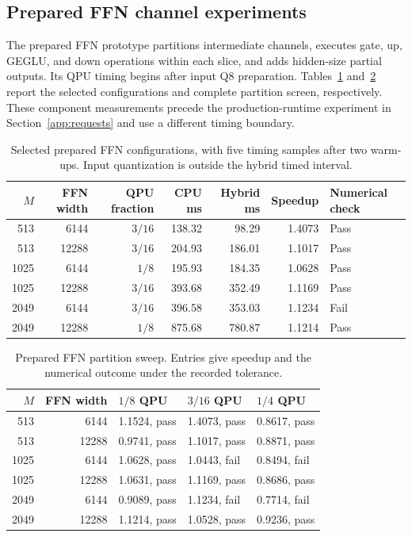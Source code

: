 \documentclass[sigplan,screen,review]{acmart}
\begin{document}
\subsection{Prepared FFN channel experiments}

The prepared FFN prototype partitions intermediate channels, executes gate, up, GEGLU, and down operations within each slice, and adds hidden-size partial outputs. Its QPU timing begins after input Q8 preparation. Tables~\ref{tab:ffn-selected} and~\ref{tab:ffn-fractions} report the selected configurations and complete partition screen, respectively. These component measurements precede the production-runtime experiment in Section~\ref{app:requests} and use a different timing boundary.

\begin{table}[t]
\centering
\caption{Selected prepared FFN configurations, with five timing samples after two warm-ups. Input quantization is outside the hybrid timed interval.}
\label{tab:ffn-selected}
\small
\begin{tabular}{@{}rrrrrrl@{}}
\toprule
$M$ & FFN width & QPU fraction & CPU ms & Hybrid ms & Speedup & Numerical check \\
\midrule
513 & 6144 & $3/16$ & 138.32 & 98.29 & 1.4073 & Pass \\
513 & 12288 & $3/16$ & 204.93 & 186.01 & 1.1017 & Pass \\
1025 & 6144 & $1/8$ & 195.93 & 184.35 & 1.0628 & Pass \\
1025 & 12288 & $3/16$ & 393.68 & 352.49 & 1.1169 & Pass \\
2049 & 6144 & $3/16$ & 396.58 & 353.03 & 1.1234 & Fail \\
2049 & 12288 & $1/8$ & 875.68 & 780.87 & 1.1214 & Pass \\
\bottomrule
\end{tabular}
\end{table}

\begin{table}[t]
\centering
\caption{Prepared FFN partition sweep. Entries give speedup and the numerical outcome under the recorded tolerance.}
\label{tab:ffn-fractions}
\small
\begin{tabular}{@{}rrlll@{}}
\toprule
$M$ & FFN width & $1/8$ QPU & $3/16$ QPU & $1/4$ QPU \\
\midrule
513 & 6144 & 1.1524, pass & 1.4073, pass & 0.8617, pass \\
513 & 12288 & 0.9741, pass & 1.1017, pass & 0.8871, pass \\
1025 & 6144 & 1.0628, pass & 1.0443, fail & 0.8494, fail \\
1025 & 12288 & 1.0631, pass & 1.1169, pass & 0.8686, pass \\
2049 & 6144 & 0.9089, pass & 1.1234, fail & 0.7714, fail \\
2049 & 12288 & 1.1214, pass & 1.0528, pass & 0.9236, pass \\
\bottomrule
\end{tabular}
\end{table}
\end{document}
